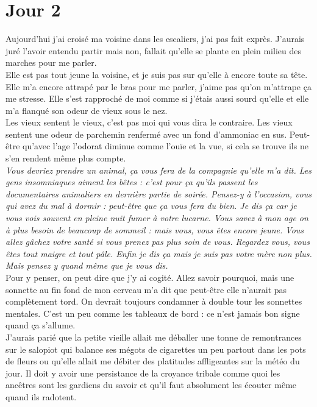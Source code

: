 \chapter*{Jour 2}
Aujourd'hui j'ai croisé ma voisine dans les escaliers, j'ai pas fait exprès. J'aurais juré l'avoir entendu partir mais non, fallait qu'elle se plante en plein milieu des marches pour me parler.\\
Elle est pas tout jeune la voisine, et je suis pas sur qu'elle à encore toute sa tête. Elle m'a encore attrapé par le bras pour me parler, j'aime pas qu'on m'attrape ça me stresse. Elle s'est rapproché de moi comme si j'étais aussi sourd qu'elle et elle m'a flanqué son odeur de vieux sous le nez.\\

Les vieux sentent le vieux, c'est pas moi qui vous dira le contraire. Les vieux sentent une odeur de parchemin renfermé avec un fond d’ammoniac en sus. Peut-être qu'avec l'age l'odorat diminue comme l’ouïe et la vue, si cela se trouve ils ne s'en rendent même plus compte.\\

\textit{Vous devriez prendre un animal, ça vous fera de la compagnie qu'elle m'a dit. Les gens insomniaques aiment les bêtes : c'est pour ça qu'ils passent les documentaires animaliers en dernière partie de soirée. Pensez-y à l'occasion, vous qui avez du mal à dormir : peut-être que ça vous fera du bien. Je dis ça car je vous vois souvent en pleine nuit fumer à votre lucarne. Vous savez à mon age on à plus besoin de beaucoup de sommeil : mais vous, vous êtes encore jeune. Vous allez gâchez votre santé si vous prenez pas plus soin de vous. Regardez vous, vous êtes tout maigre et tout pâle. Enfin je dis ça mais je suis pas votre mère non plus. Mais pensez y quand même que je vous dis.} \\

Pour y penser, on peut dire que j'y ai cogité. Allez savoir pourquoi, mais une sonnette au fin fond de mon cerveau m'a dit que peut-être elle n'aurait pas complètement tord. On devrait toujours condamner à double tour les sonnettes mentales. C'est un peu comme les tableaux de bord : ce n'est jamais bon signe quand ça s'allume. \\
J'aurais parié que la petite vieille allait me déballer une tonne de remontrances sur le salopiot qui balance ses mégots de cigarettes un peu partout dans les pots de fleurs ou qu'elle allait me débiter des platitudes affligeantes sur la météo du jour. Il doit y avoir une persistance de la croyance tribale comme quoi les ancêtres sont les gardiens du savoir et qu'il faut absolument les écouter même quand ils radotent. \\

